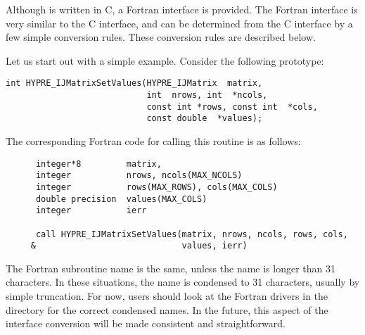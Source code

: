 Although \hypre{} is written in C, a Fortran interface is provided.
The Fortran interface is very similar to the C interface, and can be
determined from the C interface by a few simple conversion rules.
These conversion rules are described below.

Let us start out with a simple example.  Consider the following
\hypre{} prototype:
\begin{display}
\begin{verbatim}
int HYPRE_IJMatrixSetValues(HYPRE_IJMatrix  matrix,
                            int  nrows, int  *ncols,
                            const int *rows, const int  *cols,
                            const double  *values);
\end{verbatim}
\end{display}
The corresponding Fortran code for calling this routine is as follows:
\begin{display}
\begin{verbatim}
      integer*8         matrix, 
      integer           nrows, ncols(MAX_NCOLS)
      integer           rows(MAX_ROWS), cols(MAX_COLS)
      double precision  values(MAX_COLS)
      integer           ierr

      call HYPRE_IJMatrixSetValues(matrix, nrows, ncols, rows, cols,
     &                             values, ierr)
\end{verbatim}
\end{display}
The Fortran subroutine name is the same, unless the name is longer
than 31 characters.  In these situations, the name is condensed to 31
characters, usually by simple truncation.  For now, users should look
at the Fortran drivers in the  directory for the correct
condensed names.  In the future, this aspect of the interface conversion
will be made consistent and straightforward.

